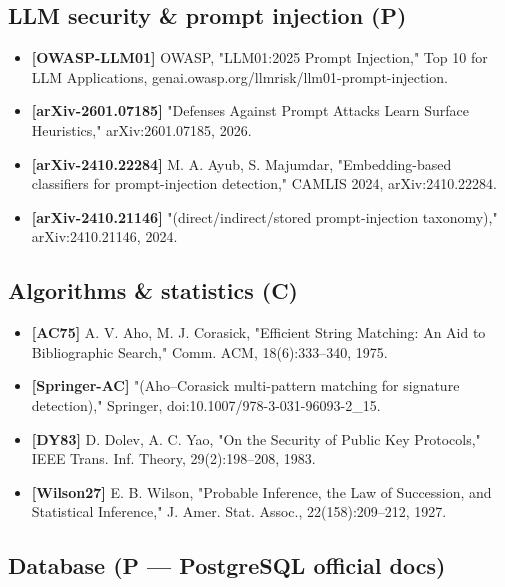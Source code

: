 \subsection{LLM security \& prompt injection
(P)}\label{llm-security--prompt-injection-p}

\begin{itemize}
\tightlist
\item
  \textbf{{[}OWASP-LLM01{]}} OWASP, "LLM01:2025 Prompt Injection," Top
  10 for LLM Applications,
  genai.owasp.org/llmrisk/llm01-prompt-injection.
\item
  \textbf{{[}arXiv-2601.07185{]}} "Defenses Against Prompt Attacks Learn
  Surface Heuristics," arXiv:2601.07185, 2026.
\item
  \textbf{{[}arXiv-2410.22284{]}} M. A. Ayub, S. Majumdar,
  "Embedding-based classifiers for prompt-injection detection," CAMLIS
  2024, arXiv:2410.22284.
\item
  \textbf{{[}arXiv-2410.21146{]}} "(direct/indirect/stored
  prompt-injection taxonomy)," arXiv:2410.21146, 2024.
\end{itemize}

\subsection{Algorithms \& statistics
(C)}\label{algorithms--statistics-c}

\begin{itemize}
\tightlist
\item
  \textbf{{[}AC75{]}} A. V. Aho, M. J. Corasick, "Efficient String
  Matching: An Aid to Bibliographic Search," Comm. ACM, 18(6):333--340,
  1975.
\item
  \textbf{{[}Springer-AC{]}} "(Aho--Corasick multi-pattern matching for
  signature detection)," Springer, doi:10.1007/978-3-031-96093-2\_15.
\item
  \textbf{{[}DY83{]}} D. Dolev, A. C. Yao, "On the Security of Public
  Key Protocols," IEEE Trans. Inf. Theory, 29(2):198--208, 1983.
\item
  \textbf{{[}Wilson27{]}} E. B. Wilson, "Probable Inference, the Law of
  Succession, and Statistical Inference," J. Amer. Stat. Assoc.,
  22(158):209--212, 1927.
\end{itemize}

\subsection{Database (P --- PostgreSQL official
docs)}\label{database-p--postgresql-official-docs}

